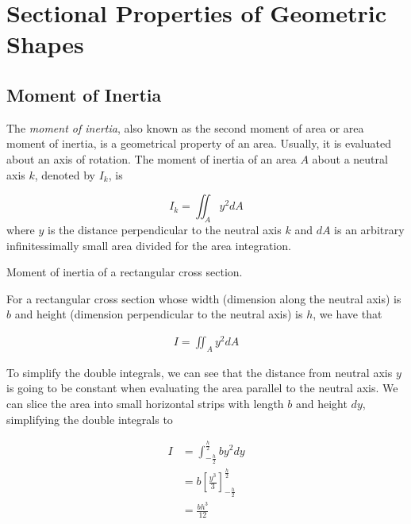 \documentclass[
10pt,
a4paper,
openany,
svgnames,
]{book}
\begin{document}
\chapter{Sectional Properties of Geometric Shapes}

\section{Moment of Inertia}

The \emph{moment of inertia}, also known as the second moment of area or area moment of inertia, is a geometrical property of an area. Usually, it is evaluated about an axis of rotation. The moment of inertia of an area $A$ about a neutral axis $k$, denoted by $I_k$, is

\begin{equation}
  I_k = \iint_A y^2 dA
\end{equation} 
where $y$ is the distance perpendicular to the neutral axis $k$ and $dA$ is an arbitrary infinitessimally small area divided for the area integration.

\begin{example} Moment of inertia of a rectangular cross section.

  For a rectangular cross section whose width (dimension along the neutral axis) is $b$ and height (dimension perpendicular to the neutral axis) is $h$, we have that

  \begin{align*}
    I = \iint_A y^2 dA
  \end{align*}

  To simplify the double integrals, we can see that the distance from neutral axis $y$ is going to be constant when evaluating the area parallel to the neutral axis. We can slice the area into small horizontal strips with length $b$ and height $dy$, simplifying the double integrals to 

  \begin{align*}
    I &= \int_{-\frac{h}{2}}^{\frac{h}{2}} by^2dy \\
      &= b \left[ \frac{y^3}{3} \right]_{-\frac{h}{2}}^{\frac{h}{2}} \\
      &= \frac{bh^3}{12}
  \end{align*}
  
\end{example}
\end{document}
